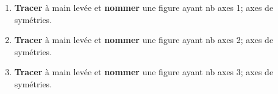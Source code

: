 \documentclass[exercice]{thedocument}%
\begin{document}
%
\begin{enumerate}
    \item \textbf{Tracer} à main levée et \textbf{nommer} une figure ayant
    \<nb axes 1; axes de symétries.
    \item \textbf{Tracer} à main levée et \textbf{nommer} une figure ayant
    \<nb axes 2; axes de symétries.
    \item \textbf{Tracer} à main levée et \textbf{nommer} une figure ayant
    \<nb axes 3; axes de symétries.
\end{enumerate}
\end{document}
